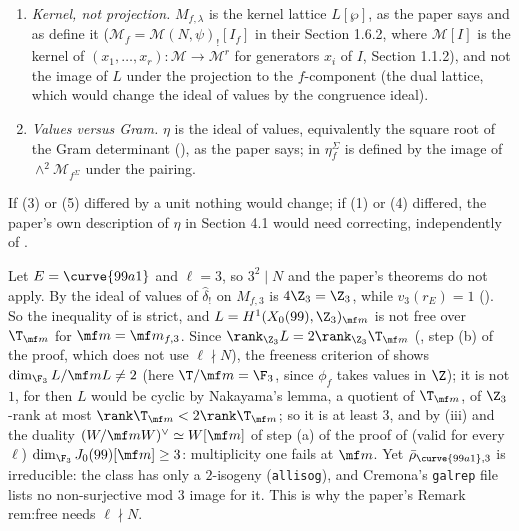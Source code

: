\begin{remark}
\begin{enumerate}[label=(\arabic*)]
and the cup product of \cite{DFG04}, divided by the index $[U:U_N]$ in their Section 1.5.2, differs from the book's by the factor $\frac12$ the paper records; this is harmless for odd $\ell$.
\item \emph{Kernel, not projection.} $M_{f,\lambda}$ is the kernel lattice $L[\wp]$, as the paper says and as \cite{DFG04} define it ($\mathcal M_f=\mathcal M(N,\psi)_![I_f]$ in their Section 1.6.2,
where $\mathcal M[I]$ is the kernel of $(x_1,\dots,x_r)\colon\mathcal M\to\mathcal M^r$ for generators $x_i$ of $I$, Section 1.1.2), and not the image of $L$ under the projection to the $f$-component (the dual lattice,
which would change the ideal of values by the congruence ideal).
\item \emph{Values versus Gram.} $\eta$ is the ideal of values, equivalently the square root of the Gram determinant (), as the paper says; in \cite[Section 1.7.3]{DFG04}
$\eta^\Sigma_f$ is defined by the image of $\wedge^2\mathcal M_{f^\Sigma}$ under the pairing.
\end{enumerate}
If (3) or (5) differed by a unit nothing would change; if (1) or (4) differed, the paper's own description of $\eta$ in Section 4.1 would need correcting, independently of
.
\end{remark}

\begin{example}[\curve{99a1} at $\ell=3$]\label{ex:moddeg:99-at-3}
Let $E=\curve{99a1}$ and $\ell=3$, so $3^2\mid N$ and the paper's theorems do not apply. By  the ideal of values of $\hat\delta_!$ on $M_{f,3}$ is $4\Z_3=\Z_3$, while
$v_3(r_E)=1$ (). So the inequality of  is strict, and $L=H^1(X_0(99),\Z_3)_{\mf m}$ is not free over $\T_{\mf m}$ for $\mf m=\mf m_{f,3}$.
Since $\rank_{\Z_3}L=2\rank_{\Z_3}\T_{\mf m}$ (, step (b) of the proof, which does not use $\ell\nmid N$), the freeness criterion of  shows
$\dim_{\F_3}L/\mf mL\ne2$ (here $\T/\mf m=\F_3$, since $\phi_f$ takes values in $\Z$); it is not $1$, for then $L$ would be cyclic by Nakayama's lemma, a quotient of $\T_{\mf m}$, of
$\Z_3$-rank at most $\rank\T_{\mf m}<2\rank\T_{\mf m}$; so it is at least $3$, and by (iii) and the duality $(W/\mf mW)^\vee\simeq W[\mf m]$ of step (a) of the proof of  (valid for every $\ell$)
$\dim_{\F_3}J_0(99)[\mf m]\ge3$: multiplicity one fails at $\mf m$. Yet $\bar\rho_{\curve{99a1},3}$ is irreducible: the class  has only a $2$-isogeny (\texttt{allisog}), and Cremona's
\texttt{galrep} file lists no non-surjective mod $3$ image for it. This is why the paper's Remark rem:free needs $\ell\nmid N$.
\end{example}

